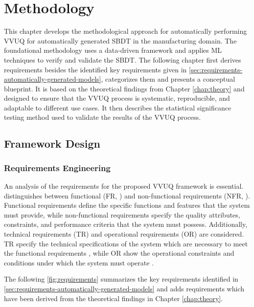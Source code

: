 \chapter{Methodology}
\label{chap:methodology}
This chapter develops the methodological approach for automatically performing VVUQ for automatically generated SBDT in the manufacturing domain. The foundational methodology uses a data-driven framework and applies ML techniques to verify and validate the SBDT. The following chapter first derives requirements besides the identified key requirements given in \autoref{sec:requirements-automatically-generated-models}, categorizes them and presents a conceptual blueprint. It is based on the theoretical findings from Chapter \ref{chap:theory} and designed to ensure that the VVUQ process is systematic, reproducible, and adaptable to different use cases. It then describes the statistical significance testing method used to validate the results of the VVUQ process.

\section{Framework Design}
\subsection{Requirements Engineering}
An analysis of the requirements for the proposed VVUQ framework is essential. \Textcite{sindhgatta2005functional} distinguishes between functional (FR, \textcite{van2001goal}) and non-functional requirements (NFR, \textcite{glinz2005rethinking}). Functional requirements define the specific functions and features that the system must provide, while non-functional requirements specify the quality attributes, constraints, and performance criteria that the system must possess. Additionally, technical requirements (TR) and operational requirements (OR) are considered. TR specify the technical specifications of the system which are necessary to meet the functional requirements \autocite{chikh2012new}, while OR show the operational constraints and conditions under which the system must operate \autocite{incose2023incose}.

The following \autoref{fig:requirements} summarizes the key requirements identified in \autoref{sec:requirements-automatically-generated-models} and adds requirements which have been derived from the theoretical findings in Chapter \ref{chap:theory}.

